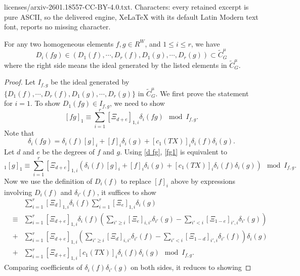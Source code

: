 \documentclass[10pt,a4paper]{amsart}
\newcommand{\wt}[1]{\widetilde{#1}}
\renewcommand\d\delta
\begin{document}
licenses/arxiv-2601.18557-CC-BY-4.0.txt. Characters: every retained excerpt is pure ASCII, so the delivered engine, XeLaTeX with its default Latin Modern text font, reports no missing character.
\begin{lemma}\label{l:Difg}
For any two homogeneous elements $f,g\in R^W$, and $1\le i\le r$, we have
\begin{equation*}
    D_i(fg)\in (D_1(f),\cdots, D_r(f), D_1(g),\cdots, D_r(g))\subset \wt C^\mu_G
\end{equation*}
where the right side means the ideal generated by the listed elements in $\wt C^\mu_G$.
\end{lemma}

\begin{proof}
    Let $I_{f,g}$ be the ideal generated by $\{D_1(f),\cdots, D_r(f), D_1(g),\cdots, D_r(g)\}$ in $\wt C^\mu_G$. We first prove the statement for $i=1$. To show $D_1(fg)\in I_{f,g}$, we need to show
    \begin{equation}\label{fg1}
        [fg]_1\equiv \sum_{i=1}^r[\Xi_{d+e}]_{1,i}\d_i(fg)\mod I_{f,g}.
    \end{equation}
    Note that
    \begin{equation}\label{d fg}
        \d_i(fg)=\d_i(f)[g]_i+[f]_i\d_i(g)+[c_1(TX)]_i\d_i(f)\d_i(g).
    \end{equation}
    Let $d$ and $e$ be the degrees of $f$ and $g$. Using \eqref{d fg}, \eqref{fg1} is equivalent to
    \begin{equation*}
    [f]_1[g]_1\equiv\sum_{i=1}^r[\Xi_{d+e}]_{1,i}\left(\d_i(f)[g]_i+[f]_i\d_i(g)+[c_1(TX)]_i\d_i(f)\d_i(g)\right)\mod I_{f,g}.
    \end{equation*}
    Now we use the definition of $D_i(f)$ to replace $[f]_i$ above by expressions involving $D_i(f)$ and $\d_{i'}(f)$, it suffices to show
    \begin{eqnarray*}
        &&\sum_{i=1}^r[\Xi_d]_{1,i}\d_i(f)\sum_{i=1}^r[\Xi_e]_{1,i}\d_i(g)\\
        &\equiv& \sum_{i=1}^r[\Xi_{d+e}]_{1,i}\d_i(f)\left(\sum_{i'\ge i}[\Xi_e]_{i,i'}\d_{i'}(g)-\sum_{i'< i}[\Xi_{1-e}]_{i',i}\d_{i'}(g)\right)\\
        &+&\sum_{i=1}^r[\Xi_{d+e}]_{1,i}\left(\sum_{i'\ge i}[\Xi_d]_{i,i'}\d_{i'}(f)-\sum_{i'< i}[\Xi_{1-d}]_{i',i}\d_{i'}(f)\right)\d_i(g)\\
        &+&\sum_{i=1}^r[\Xi_{d+e}]_{1,i}[c_1(TX)]_i\d_i(f)\d_i(g)\mod I_{f,g}.
    \end{eqnarray*}
    Comparing coefficients of $\d_i(f)\d_{i'}(g)$ on both sides, it reduces to showing

\end{proof}
\end{document}
